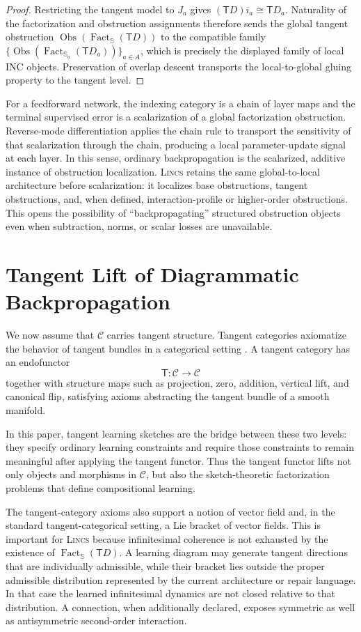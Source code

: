 \documentclass{article}
\newcommand{\C}{\mathcal{C}}
\newcommand{\T}{\mathsf{T}}
\newcommand{\Fact}{\operatorname{Fact}}
\newcommand{\Obs}{\operatorname{Obs}}
\begin{document}
\begin{proof}
Restricting the tangent model to \(J_a\) gives
\((\T D)i_a\cong\T D_a\).  Naturality of the factorization and obstruction
assignments therefore sends the global tangent obstruction
\(\Obs(\Fact_{\mathbb S}(\T D))\) to the compatible family
\(\{\Obs(\Fact_{\mathbb S_a}(\T D_a))\}_{a\in A}\), which is precisely the
displayed family of local INC objects.  Preservation of overlap descent
transports the local-to-global gluing property to the tangent level.\qedhere
\end{proof}

For a feedforward network, the indexing category is a chain of layer maps and
the terminal supervised error is a scalarization of a global factorization
obstruction.  Reverse-mode differentiation applies the chain rule to transport
the sensitivity of that scalarization through the chain, producing a local
parameter-update signal at each layer.  In this sense, ordinary
backpropagation is the scalarized, additive instance of obstruction
localization.  \textsc{Lincs}   retains the same global-to-local architecture before
scalarization: it localizes base obstructions, tangent obstructions, and, when
defined, interaction-profile or higher-order obstructions.  This opens the possibility of
``backpropagating'' structured obstruction objects even when subtraction,
norms, or scalar losses are unavailable.

\section{Tangent Lift of Diagrammatic Backpropagation}

We now assume that \(\C\) carries tangent structure. Tangent categories axiomatize the behavior of tangent bundles in a categorical setting \citep{cockett2014tangent}. A tangent category has an endofunctor
\[
\T:\C\to\C
\]
together with structure maps such as projection, zero, addition, vertical lift, and canonical flip, satisfying axioms abstracting the tangent bundle of a smooth manifold.

In this paper, tangent learning sketches are the bridge between these two levels: they specify ordinary learning constraints and require those constraints to remain meaningful after applying the tangent functor. Thus the tangent functor lifts not only objects and morphisms in \(\C\), but also the sketch-theoretic factorization problems that define compositional learning.

The tangent-category axioms also support a notion of vector field and, in the standard tangent-categorical setting, a Lie bracket of vector fields. This is important for \textsc{Lincs}   because infinitesimal coherence is not exhausted by the existence of \(\Fact_{\mathbb S}(\T D)\). A learning diagram may generate tangent directions that are individually admissible, while their bracket lies outside the proper admissible distribution represented by the current architecture or repair language. In that case the learned infinitesimal dynamics are not closed relative to that distribution. A connection, when additionally declared, exposes symmetric as well as antisymmetric second-order interaction.
\end{document}
